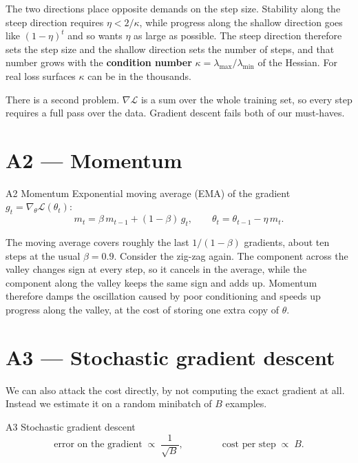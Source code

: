 \documentclass[11pt]{article}
\newcommand{\Loss}{\mathcal{L}}
\begin{document}
\noindent
The two directions place opposite demands on the step size. Stability along the steep
direction requires $\eta < 2/\kappa$, while progress along the shallow direction goes like
$(1-\eta)^{t}$ and so wants $\eta$ as large as possible. The steep direction therefore
sets the step size and the shallow direction sets the number of steps, and that number
grows with the \textbf{condition number} $\kappa = \lambda_{\max}/\lambda_{\min}$ of the
Hessian. For real loss surfaces $\kappa$ can be in the thousands.

\medskip
\noindent
There is a second problem. $\nabla\Loss$ is a sum over the whole training set, so every
step requires a full pass over the data. Gradient descent fails both of our must-haves.

\section{A2 --- Momentum}

\begin{algbox}{A2 \; Momentum}
Exponential moving average (EMA) of the gradient $g_t = \nabla_\theta \Loss(\theta_t)$:
\[
  m_{t} = \beta\, m_{t-1} + (1-\beta)\, g_{t},
  \qquad
  \theta_{t} = \theta_{t-1} - \eta\, m_{t}.
\]
\end{algbox}

\noindent
The moving average covers roughly the last $1/(1-\beta)$ gradients, about ten steps at
the usual $\beta = 0.9$. Consider the zig-zag again. The component across the valley
changes sign at every step, so it cancels in the average, while the component along the
valley keeps the same sign and adds up. Momentum therefore damps the oscillation caused by
poor conditioning and speeds up progress along the valley, at the cost of storing one
extra copy of $\theta$.

\section{A3 --- Stochastic gradient descent}

We can also attack the cost directly, by not computing the exact gradient at all.
Instead we estimate it on a random minibatch of $B$ examples.

\begin{algbox}{A3 \; Stochastic gradient descent}
\[
  \text{error on the gradient} \;\propto\; \frac{1}{\sqrt{B}},
  \qquad\qquad
  \text{cost per step} \;\propto\; B .
\]
\end{algbox}
\end{document}
